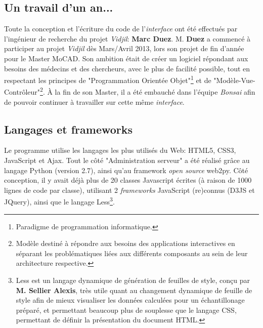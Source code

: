 \documentclass[pdftex,12pt,a4paper]{report}
\begin{document}
\begin{spacing}{1.2}
\subsection{Un travail d'un an...}
Toute la conception et l'écriture du code de l'\textit{interface} ont été effectués par l'ingénieur de recherche du projet \textit{Vidjil}: \textbf{Marc Duez}. 
\newline
M. \textbf{Duez} a commencé à participer au projet \textit{Vidjil} dès Mars/Avril 2013, lors son projet de fin d'année pour le Master MoCAD.
Son ambition était de créer un logiciel répondant aux besoins des médecins et des chercheurs, avec le plus de facilité possible, tout en respectant les principes de "Programmation Orientée Objet"\footnote{Paradigme de programmation informatique.} et de "Modèle-Vue-Contrôleur"\footnote{Modèle destiné à répondre aux besoins des applications interactives en séparant les problématiques liées aux différents composants au sein de leur architecture respective.}.
\newline
À la fin de son Master, il a été embauché dans l'équipe \textit{Bonsai} afin de pouvoir continuer à travailler sur cette même \textit{interface}.

\subsection{Langages et frameworks}
Le programme utilise les langages les plus utilisés du Web: HTML5, CSS3, JavaScript et Ajax.
\newline
Tout le côté "Administration serveur" a été réalisé grâce au langage Python (version 2.7), ainsi qu'au framework \textit{open source} web2py.
\newline
Côté conception, il y avait déjà plus de 20 classes Javascript écrites (à raison de 1000 lignes de code par classe), utilisant 2 \textit{frameworks} JavaScript (re)connus (D3JS et JQuery), ainsi que le langage Less\footnote{Less est un langage dynamique de génération de feuilles de style, conçu par \textbf{M. Sellier Alexis}, très utile quant au changement dynamique de feuille de style afin de mieux visualiser les données calculées pour un échantillonage préparé, et permettant beaucoup plus de souplesse que le langage CSS, permettant de définir la présentation du document HTML.}.


\end{spacing}
\end{document}
